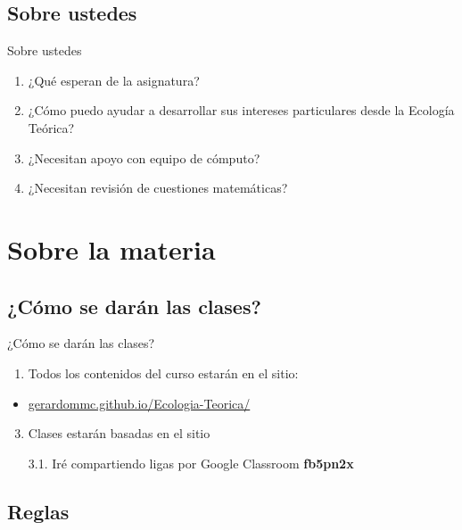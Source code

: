\documentclass[
  11pt,
  ignorenonframetext,
]{beamer}
\providecommand{\tightlist}{%
  \setlength{\itemsep}{0pt}\setlength{\parskip}{0pt}}
\begin{document}
\subsection{Sobre ustedes}\label{sobre-ustedes}

\begin{frame}{Sobre ustedes}
\begin{enumerate}
\tightlist
\item
  ¿Qué esperan de la asignatura?
\item
  ¿Cómo puedo ayudar a desarrollar sus intereses particulares desde la
  Ecología Teórica?
\item
  ¿Necesitan apoyo con equipo de cómputo?
\item
  ¿Necesitan revisión de cuestiones matemáticas?
\end{enumerate}
\end{frame}

\section{Sobre la materia}\label{sobre-la-materia}

\subsection{¿Cómo se darán las
clases?}\label{cuxf3mo-se-daruxe1n-las-clases}

\begin{frame}{¿Cómo se darán las clases?}
\begin{enumerate}
\tightlist
\item
  Todos los contenidos del curso estarán en el sitio:
\end{enumerate}

\begin{itemize}
\tightlist
\item
  \href{https://gerardommc.github.io/Ecologia-Teorica/}{gerardommc.github.io/Ecologia-Teorica/}
\end{itemize}

\begin{enumerate}
\setcounter{enumi}{2}
\item
  Clases estarán basadas en el sitio

  3.1. Iré compartiendo ligas por Google Classroom \textbf{fb5pn2x}
\end{enumerate}
\end{frame}

\subsection{Reglas}\label{reglas}
\end{document}
